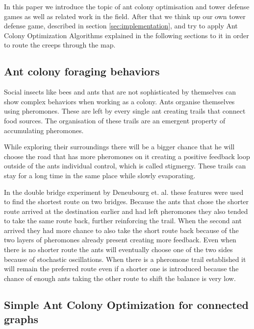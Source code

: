 In this paper we introduce the topic of ant colony optimisation and tower defense games as well as related work in the field. After that we think up our own tower defense game, described in section \ref{sec:implementation}, and try to apply Ant Colony Optimization Algorithms explained in the following sections to it in order to route the creeps through the map.

\subsection{Ant colony foraging behaviors}


Social insects like bees and ants that are not sophisticated by themselves can show complex behaviors when working as a colony. Ants organise themselves using pheromones. These are left by every single ant creating trails that connect food sources. The organisation of these trails are an emergent property of accumulating pheromones\cite{blum2005ant}.

While exploring their surroundings there will be a bigger chance that he will choose the road that has more pheromones on it creating a positive feedback loop outside of the ants individual control, which is called stigmergy. These trails can stay for a long time in the same place while slowly evaporating\cite{cordon2002review}.

In the double bridge experiment by Deneubourg et. al. these features were used to find the shortest route on two bridges. Because the ants that chose the shorter route arrived at the destination earlier and had left pheromones they also tended to take the same route back, further reinforcing the trail. When the second ant arrived they had more chance to also take the short route back because of the two layers of pheromones already present creating more feedback\cite{deneubourg1990self}. Even when there is no shorter route the ants will eventually choose one of the two sides because of stochastic oscillations. When there is a pheromone trail established it will remain the preferred route even if a shorter one is introduced because the chance of enough ants taking the other route to shift the balance is very low\cite{dorigo2006introduction}.

\subsection{Simple Ant Colony Optimization for connected graphs}

